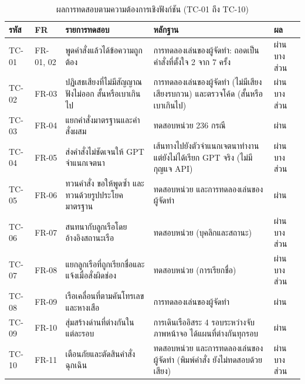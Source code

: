 \begin{table}[!htbp]
\centering
\caption{ผลการทดสอบตามความต้องการเชิงฟังก์ชัน (TC-01 ถึง TC-10)}
\label{tab:test_result}
\begin{tabular}{|L{1.12cm}|L{1.21cm}|L{5.04cm}|L{3.36cm}|L{1.68cm}|}
\hline
\textbf{รหัส} & \textbf{FR} & \textbf{รายการทดสอบ} & \textbf{หลักฐาน} & \textbf{ผล} \\
\hline
TC-01 & FR-01, 02 & พูดคำสั่งแล้วได้ข้อความถูกต้อง & การทดลองเล่นของผู้จัดทำ: ถอดเป็นคำสั่งที่ตั้งใจ 2 จาก 7 ครั้ง & ผ่านบางส่วน \\ \hline
TC-02 & FR-03 & ปฏิเสธเสียงที่ไม่มีสัญญาณ ฟังไม่ออก สั้นหรือเบาเกินไป & การทดลองเล่นของผู้จัดทำ (ไม่มีเสียง เสียงรบกวน) และตรวจโค้ด (สั้นหรือเบาเกินไป) & ผ่านบางส่วน \\ \hline
TC-03 & FR-04 & แยกคำสั่งมาตรฐานและคำสั่งผสม & ทดสอบหน่วย 236 กรณี & ผ่าน \\ \hline
TC-04 & FR-05 & ส่งคำสั่งไม่ชัดเจนให้ GPT จำแนกเจตนา & เส้นทางไปยังตัวจำแนกเจตนาทำงาน แต่ยังไม่ได้เรียก GPT จริง (ไม่มีกุญแจ API) & ผ่านบางส่วน \\ \hline
TC-05 & FR-06 & ทวนคำสั่ง ขอให้พูดซ้ำ และทวนด้วยรูปประโยคมาตรฐาน & ทดสอบหน่วย และการทดลองเล่นของผู้จัดทำ & ผ่าน \\ \hline
TC-06 & FR-07 & สนทนากับลูกเรือโดยอ้างอิงสถานะเรือ & ทดสอบหน่วย (บุคลิกและสถานะ) & ผ่านบางส่วน \\ \hline
TC-07 & FR-08 & แยกลูกเรือที่ถูกเรียกชื่อและแจ้งเมื่อสั่งผิดช่อง & ทดสอบหน่วย (การเรียกชื่อ) & ผ่านบางส่วน \\ \hline
TC-08 & FR-09 & เรือเคลื่อนที่ตามคันโทรเลขและหางเสือ & การทดลองเล่นของผู้จัดทำ & ผ่าน \\ \hline
TC-09 & FR-10 & สุ่มสร้างด่านที่ต่างกันในแต่ละรอบ & การเดินเรืออิสระ 4 รอบระหว่างจับภาพหน้าจอ ได้แผนที่ต่างกันทุกรอบ & ผ่าน \\ \hline
TC-10 & FR-11 & เตือนภัยและตัดสินคำสั่งฉุกเฉิน & ทดสอบหน่วย และการทดลองเล่นของผู้จัดทำ (พิมพ์คำสั่ง ยังไม่ทดสอบด้วยเสียง) & ผ่านบางส่วน \\ \hline
\end{tabular}
\end{table}

